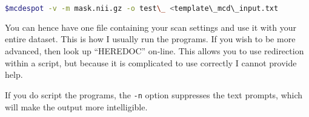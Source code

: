 \documentclass{report}
\begin{document}
\begin{lstlisting}[language=sh]
$mcdespot -v -m mask.nii.gz -o test\_ <template\_mcd\_input.txt
\end{lstlisting}

You can hence have one file containing your scan settings and use it with your entire dataset. This is how I usually run the programs. If you wish to be more advanced, then look up ``HEREDOC'' on-line. This allows you to use redirection within a script, but because it is complicated to use correctly I cannot provide help.

If you do script the programs, the \texttt{-n} option suppresses the text prompts, which will make the output more intelligible.

\printbibliography
\end{document}
